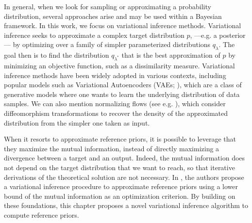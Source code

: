 



In general, when we look for sampling or approximating a probability distribution,
several approaches arise and may be used within a Bayesian framework. %
In this work, we focus on variational inference methods.
Variational inference seeks to approximate a complex target distribution 
 $p$, ---e.g. a posterior--- by optimizing over a family of simpler parameterized distributions $q_{\lambda}$. The goal then is to find the distribution $q_{\lambda^\ast}$ that is the best approximation of $p$ by minimizing an objective function, such as a dissimilarity measure. %
Variational inference methods have been widely adopted in various contexts, including popular models such as Variational Autoencoders (VAEs; \cite{kingma_introduction_2019}), which are a class of generative models where one wants to learn the underlying distribution of data samples. We can also mention normalizing flows (see e.g. \cite{papamakarios_normalizing_2021,kobyzev_normalizing_2021}), 
 which consider diffeomorphism transformations to recover the density of the approximated distribution from the simpler one taken as input.


When it resorts to approximate {reference priors}, it is possible to leverage
that they maximize the mutual information, instead of directly maximizing a divergence between a target and an output. Indeed, the mutual information does not depend on the target distribution that we want to reach, so that iterative derivations of the theoretical {solution} are not necessary. In \cite{nalisnick_learning_2017}, the authors propose a variational inference procedure to approximate reference priors using a lower bound of the mutual information as an optimization criterion. %
%
By building on these foundations, this chapter proposes a novel variational inference algorithm to compute reference priors.  %



